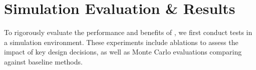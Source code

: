 \section{Simulation Evaluation \& Results}\label{sec:results}


To rigorously evaluate the performance and benefits of \PlannerName, we first conduct tests in a simulation environment. These experiments include ablations to assess the impact of key design decisions, as well as Monte Carlo evaluations comparing \PlannerNameSpaced against baseline methods.


